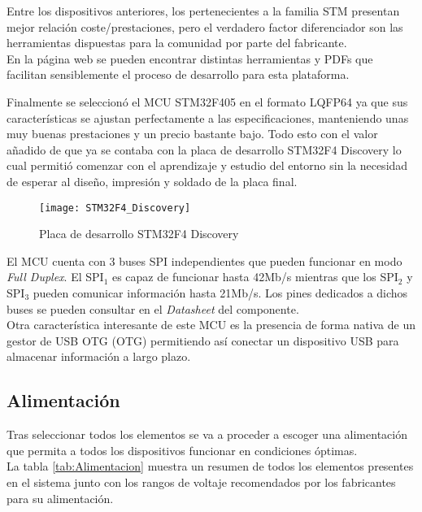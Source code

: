 Entre los dispositivos anteriores, los pertenecientes a la familia STM presentan mejor relación coste/prestaciones, pero el verdadero factor diferenciador son las herramientas dispuestas para la comunidad por parte del fabricante.
\\En la página web se pueden encontrar distintas herramientas y PDFs que facilitan sensiblemente el proceso de desarrollo para esta plataforma. 

Finalmente se seleccionó el \acrshort{MCU} STM32F405 en el formato \acrshort{LQFP64} ya que sus características se ajustan perfectamente a las especificaciones, manteniendo unas muy buenas prestaciones y un precio bastante bajo. Todo esto con el valor añadido de que ya se contaba con la placa de desarrollo STM32F4 Discovery lo cual permitió comenzar con el aprendizaje y estudio del entorno sin la necesidad de esperar al diseño, impresión y soldado de la placa final.

\begin{figure} [h]
    \centering
    \texttt{[image: STM32F4\_Discovery]}
    \caption{Placa de desarrollo STM32F4 Discovery}
    \label{fig:STM32F4_Discovery}
\end{figure}

El \acrshort{MCU} cuenta con 3 buses SPI independientes que pueden funcionar en modo \textit{\gls{Full Duplex}}. El SPI$_1$  es capaz de funcionar hasta 42Mb/s mientras que los SPI$_2$ y SPI$_3$ pueden comunicar información hasta 21Mb/s. Los pines dedicados a dichos buses se pueden consultar en el \textit{Datasheet} del componente\cite{Datasheet_STM}.
\\Otra característica interesante de este \acrshort{MCU} es la presencia de forma nativa de un gestor de \acrshort{USB} \acrlong{OTG} (\acrshort{OTG}) permitiendo así conectar un dispositivo \acrshort{USB} para almacenar información a largo plazo.

\clearpage

\subsection{Alimentación\label{sec:Alimentación}}

Tras seleccionar todos los elementos se va a proceder a escoger una alimentación que permita a todos los dispositivos funcionar en condiciones óptimas.
\\La tabla \ref{tab:Alimentacion} muestra un resumen de todos los elementos presentes en el sistema junto con los rangos de voltaje recomendados por los fabricantes para su alimentación.


